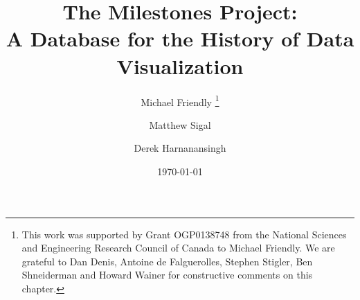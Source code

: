 \documentclass[11pt]{article}
\begin{document}
\title{The Milestones Project: \\ A Database for the History of Data Visualization}
\author{Michael Friendly%
\thanks{This work was supported by Grant OGP0138748 from the National Sciences and Engineering Research Council of Canada to Michael Friendly.
  We are grateful to 
Dan Denis, 
Antoine de Falguerolles,
Stephen Stigler, 
Ben Shneiderman and
Howard Wainer
for constructive comments on this chapter.
  }
 \and Matthew Sigal 
 \and Derek Harnanansingh}
\date{\today}

\maketitle

\begin{abstract}
\begin{comment}
Re-reading the abstract, I think it could be rephrased slightly to update the language with more modern historical scholarship (most of the changes are in paragraph 1).
Here is what I propose:

Methods of data visualization have evolved substantially over their relatively brief history.
Landmarks in this story were the first thematic maps in the 1600s, the invention of the bar chart and the line graph in the early 1800s,
and the dynamic and interactive graphics of today.
While these developments have been previously detailed in various micro-histories,
they were aimed at a privileged and academic audience, and a publicly accessible and free space to house a macro-history in its totality did not exist.

The purpose of this chapter is threefold:
first, to introduce the reader our solution to this absence through an online resource called the Milestones Project.
This website highlights important events in the history of data visualization, and enables users to interactively travel through time to see and explore the
context that surrounded their developments.
Secondly, we present some striking visual examples that deal with conveying aspects of history over time, drawn from this resource.
Finally, the Milestones database itself will be used to showcase how such a resource can serve as ``data'' for \emph{statistical historiography},
which entails the use of statistical and graphical methods for the analysis and understanding of historical innovations, developments, and trends.
\end{comment}


\end{abstract}
\end{document}
